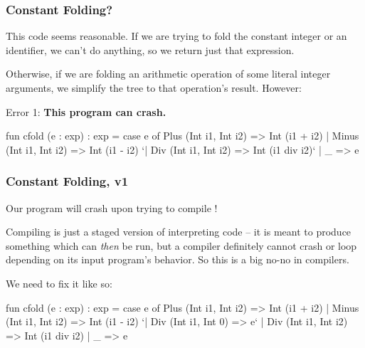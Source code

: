 \documentclass[aspectratio=169, handout]{beamer}
\begin{document}
\begin{frame}[fragile]
  \frametitle{Constant Folding?}

  This code seems reasonable. If we are trying to fold the constant integer
  or an identifier, we can't do anything, so we return just that expression.

  \pause
  \vspace{\fill}

  Otherwise, if we are folding an arithmetic operation of some literal integer
  arguments, we simplify the tree to that operation's result. However:

  \pause
  \vspace{\fill}

  Error 1: \textbf{This program can crash.}

  \pause
  \vspace{\fill}

  {\small
  \begin{codeblock}
    fun cfold (e : exp) : exp =
      case e of
        Plus  (Int i1, Int i2) => Int (i1 + i2)
      | Minus (Int i1, Int i2) => Int (i1 - i2)
      `| Div   (Int i1, Int i2) => Int (i1 div i2)`
      | _ => e
  \end{codeblock}
  }
\end{frame}

\begin{frame}[fragile]
  \frametitle{Constant Folding, v1}

  Our program will crash upon trying to compile !

  \pause
  \vspace{\fill}

  Compiling is just a staged version of interpreting code -- it is meant to
  produce something which can \textit{then} be run, but a compiler definitely
  cannot crash or loop depending on its input program's behavior. So this is
  a big no-no in compilers.

  \pause
  \vspace{\fill}

  We need to fix it like so:

  \pause
  {\small
  \begin{codeblock}
    fun cfold (e : exp) : exp =
      case e of
        Plus  (Int i1, Int i2) => Int (i1 + i2)
      | Minus (Int i1, Int i2) => Int (i1 - i2)
      `| Div   (Int i1, Int 0) => e`
      | Div   (Int i1, Int i2) => Int (i1 div i2)
      | _ => e
  \end{codeblock}
  }
\end{frame}
\end{document}
